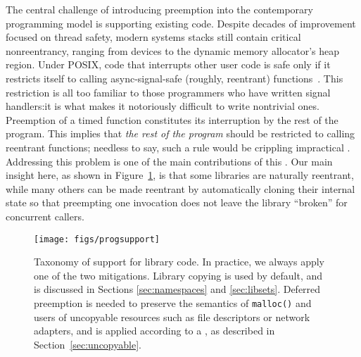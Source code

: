 The central challenge of introducing preemption into the contemporary programming
model is supporting existing code.  Despite decades of improvement focused on thread
safety, modern systems stacks still contain critical nonreentrancy, ranging from
devices to the dynamic memory allocator's heap region.
Under POSIX, code that interrupts other user code is safe only if it restricts
itself to calling async-signal-safe (roughly, reentrant)
functions~\cite{signal-safety-manpage}.  This restriction is all too familiar to
those programmers who have written signal handlers:\@ it is what makes it notoriously
difficult to write nontrivial ones.  Preemption of a timed function constitutes its
interruption by the rest of the program.  This implies that \textit{the rest of the
program} should be restricted to calling reentrant functions; needless to say, such
a rule would be
\ifdefined\dga
crippling\xspace
\else
impractical\xspace
\fi.  Addressing this problem is one of the main contributions
of this \paper.  Our main insight here, as shown in Figure~\ref{fig:progsupport}, is
that some libraries are naturally reentrant, while many others can be made reentrant
by automatically cloning their internal state so that preempting one invocation does
not leave the library ``broken'' for concurrent callers.

\begin{figure}
\texttt{[image: figs/progsupport]}
\caption{Taxonomy of support for library code.  \textnormal{In practice, we always
apply one of the two mitigations.  Library copying is used by default, and is
discussed in Sections \ref{sec:namespaces} and \ref{sec:libsets}.  Deferred
preemption is needed to preserve the semantics of \texttt{malloc()} and users of
uncopyable resources such as file descriptors or network adapters, and is applied
according to a \whitelist, as described in Section~\ref{sec:uncopyable}.}}
\label{fig:progsupport}
\end{figure}

